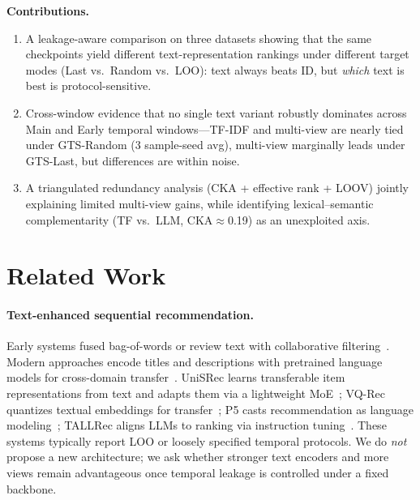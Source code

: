 \documentclass[sigconf,natbib=true,anonymous]{acmart}
\newcommand{\tfidf}{\textsc{TF-IDF}\xspace}
\begin{document}
\smallskip\noindent\textbf{Contributions.}
\begin{enumerate}[leftmargin=*,itemsep=1pt]
\item A leakage-aware comparison on three datasets showing that the same checkpoints yield different text-representation rankings under different target modes (Last vs.\ Random vs.\ LOO): text always beats ID, but \emph{which} text is best is protocol-sensitive.
\item Cross-window evidence that no single text variant robustly dominates across Main and Early temporal windows---\tfidf and multi-view are nearly tied under GTS-Random (3 sample-seed avg), multi-view marginally leads under GTS-Last, but differences are within noise.
\item A triangulated redundancy analysis (CKA + effective rank + LOOV) jointly explaining limited multi-view gains, while identifying lexical--semantic complementarity (TF vs.\ LLM, CKA$\approx$0.19) as an unexploited axis.
\end{enumerate}

\section{Related Work}
\label{sec:related}

\paragraph{Text-enhanced sequential recommendation.}
Early systems fused bag-of-words or review text with collaborative filtering~\cite{wang2015cdl,salton1988termweighting}.
Modern approaches encode titles and descriptions with pretrained language models for cross-domain transfer~\cite{hou2022unisrec,hou2023vqrec,geng2022p5,bao2023tallrec}.
UniSRec learns transferable item representations from text and adapts them via a lightweight MoE~\cite{hou2022unisrec}; VQ-Rec quantizes textual embeddings for transfer~\cite{hou2023vqrec}; P5 casts recommendation as language modeling~\cite{geng2022p5}; TALLRec aligns LLMs to ranking via instruction tuning~\cite{bao2023tallrec}.
These systems typically report LOO or loosely specified temporal protocols.
We do \emph{not} propose a new architecture; we ask whether stronger text encoders and more views remain advantageous once temporal leakage is controlled under a fixed backbone.
\end{document}
